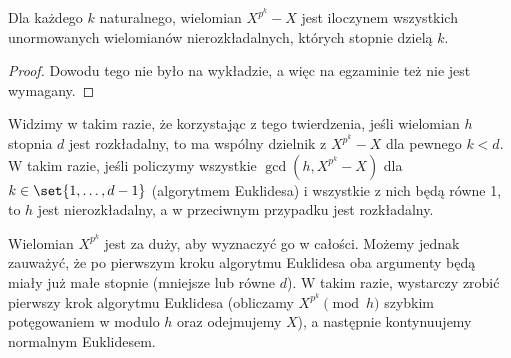 \begin{theorem}
	Dla każdego \(k\) naturalnego, wielomian \(X^{p^k} - X\) jest iloczynem wszystkich unormowanych wielomianów nierozkładalnych, których stopnie dzielą \(k\).
\end{theorem}
\begin{proof}
	Dowodu tego nie było na wykładzie, a więc na egzaminie też nie jest wymagany.
\end{proof}

Widzimy w takim razie, że korzystając z tego twierdzenia, jeśli wielomian \(h\) stopnia \(d\) jest rozkładalny, to ma wspólny dzielnik z \(X^{p^k} - X\) dla pewnego \(k < d\). W takim razie, jeśli policzymy wszystkie \(\gcd(h, X^{p^k} - X)\) dla \(k \in \set{1,\dots,d-1}\) (algorytmem Euklidesa) i wszystkie z nich będą równe 1, to \(h\) jest nierozkładalny, a w przeciwnym przypadku jest rozkładalny.

Wielomian \(X^{p^k}\) jest za duży, aby wyznaczyć go w całości. Możemy jednak zauważyć, że po pierwszym kroku algorytmu Euklidesa oba argumenty będą miały już małe stopnie (mniejsze lub równe \(d\)). W takim razie, wystarczy zrobić pierwszy krok algorytmu Euklidesa (obliczamy \(X^{p^k} \pmod{h}\) szybkim potęgowaniem w modulo \(h\) oraz odejmujemy \(X\)), a następnie kontynuujemy normalnym Euklidesem.
